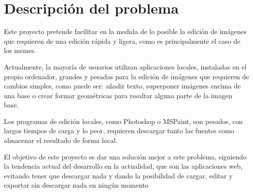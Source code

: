 \chapter{Descripción del problema}

Este proyecto pretende facilitar en la medida de lo posible la edición de imágenes que requieren
de una edición rápida y ligera, como es principalmente el caso de los memes.

Actualmente, la mayoría de usuarios utilizan aplicaciones locales, instaladas en el propio
ordenador, grandes y pesadas para la edición de imágenes que requieren de cambios simples, 
como puede ser: añadir texto, superponer imágenes encima de una base o crear formar geométricas
para resaltar alguna parte de la imagen base.

Los programas de edición locales, como Photoshop o MSPaint, son pesados, con largos tiempos de
carga y lo peor, requieren descargar tanto las fuentes como almacenar el resultado de forma local.

El objetivo de este proyecto es dar una solución mejor a este problema, siguiendo la tendencia
actual del desarrollo en la actualidad, que son las aplicaciones web, evitando tener que descargar
nada y dando la posibilidad de cargar, editar y exportar sin descargar nada en ningún momento


